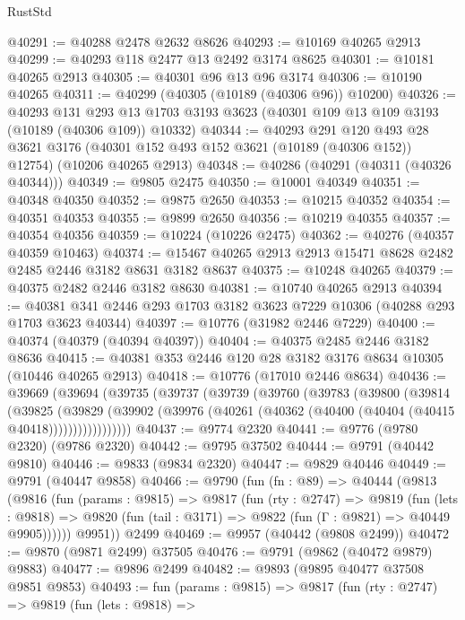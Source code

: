 \begin{lexlean}{RustStd}
\begin{coremodule}
@40291 := @40288 @2478 @2632 @8626
@40293 := @10169 @40265 @2913
@40299 := @40293 @118 @2477 @13 @2492 @3174 @8625
@40301 := @10181 @40265 @2913
@40305 := @40301 @96 @13 @96 @3174
@40306 := @10190 @40265
@40311 := @40299 (@40305 (@10189 (@40306 @96)) @10200)
@40326 := @40293
    @131
    @293
    @13
    @1703
    @3193
    @3623
    (@40301 @109 @13 @109 @3193 (@10189 (@40306 @109)) @10332)
@40344 := @40293
    @291
    @120
    @493
    @28
    @3621
    @3176
    (@40301 @152 @493 @152 @3621 (@10189 (@40306 @152)) @12754)
    (@10206 @40265 @2913)
@40348 := @40286 (@40291 (@40311 (@40326 @40344)))
@40349 := @9805 @2475
@40350 := @10001 @40349
@40351 := @40348 @40350
@40352 := @9875 @2650
@40353 := @10215 @40352
@40354 := @40351 @40353
@40355 := @9899 @2650
@40356 := @10219 @40355
@40357 := @40354 @40356
@40359 := @10224 (@10226 @2475)
@40362 := @40276 (@40357 @40359 @10463)
@40374 := @15467 @40265 @2913 @2913 @15471 @8628 @2482 @2485 @2446 @3182 @8631 @3182 @8637
@40375 := @10248 @40265
@40379 := @40375 @2482 @2446 @3182 @8630
@40381 := @10740 @40265 @2913
@40394 := @40381 @341 @2446 @293 @1703 @3182 @3623 @7229 @10306 (@40288 @293 @1703 @3623 @40344)
@40397 := @10776 (@31982 @2446 @7229)
@40400 := @40374 (@40379 (@40394 @40397))
@40404 := @40375 @2485 @2446 @3182 @8636
@40415 := @40381 @353 @2446 @120 @28 @3182 @3176 @8634 @10305 (@10446 @40265 @2913)
@40418 := @10776 (@17010 @2446 @8634)
@40436 := @39669
    (@39694
      (@39735
        (@39737
          (@39739
            (@39760
              (@39783
                (@39800
                  (@39814
                    (@39825
                      (@39829
                        (@39902
                          (@39976 (@40261 (@40362 (@40400 (@40404 (@40415 @40418)))))))))))))))))
@40437 := @9774 @2320
@40441 := @9776 (@9780 @2320) (@9786 @2320)
@40442 := @9795 @37502
@40444 := @9791 (@40442 @9810)
@40446 := @9833 (@9834 @2320)
@40447 := @9829 @40446
@40449 := @9791 (@40447 @9858)
@40466 := @9790
    (fun (fn : @89) =>
    @40444
      (@9813
        (@9816
          (fun (params : @9815) =>
          @9817
            (fun (rty : @2747) =>
            @9819
              (fun (lets : @9818) =>
              @9820 (fun (tail : @3171) => @9822 (fun (Γ : @9821) => @40449 @9905))))))
        @9951))
    @2499
@40469 := @9957 (@40442 (@9808 @2499))
@40472 := @9870 (@9871 @2499) @37505
@40476 := @9791 (@9862 (@40472 @9879) @9883)
@40477 := @9896 @2499
@40482 := @9893 (@9895 @40477 @37508 @9851 @9853)
@40493 := fun (params : @9815) =>
  @9817
    (fun (rty : @2747) =>
    @9819
      (fun (lets : @9818) =>

\end{coremodule}
\end{lexlean}
